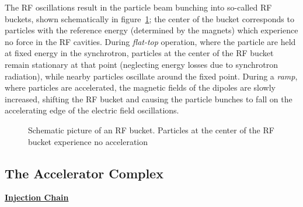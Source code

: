 The RF oscillations result in the particle beam bunching into so-called RF buckets, shown schematically in figure~\ref{fig:RF-bucket}; the center of the bucket corresponds to particles with the reference energy (determined by the magnets) which experience no force in the RF cavities. During \emph{flat-top} operation, where the particle are held at fixed energy in the synchrotron, particles at the center of the RF bucket remain stationary at that point (neglecting energy losses due to synchrotron radiation), while nearby particles oscillate around the fixed point. During a \emph{ramp}, where particles are accelerated, the magnetic fields of the dipoles are slowly increased, shifting the RF bucket and causing the particle bunches to fall on the accelerating edge of the electric field oscillations. 

\begin{figure}[htbp]
	\centering
	\caption{Schematic picture of an RF bucket. Particles at the center of the RF bucket experience no acceleration}
	\label{fig:RF-bucket}
\end{figure}



\subsection{The Accelerator Complex}

\underline{\textbf{Injection Chain}}

